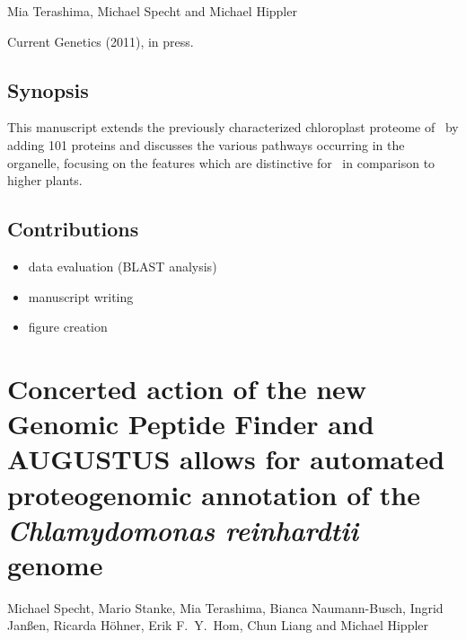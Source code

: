 Mia Terashima, Michael Specht and Michael Hippler

Current Genetics (2011), in press.

\subsection*{Synopsis}

This manuscript extends the previously characterized chloroplast proteome
of \cre~by adding 101 proteins and discusses the various pathways occurring in 
the organelle, focusing on the features which are distinctive for \cre~in
comparison to higher plants.

\subsection*{Contributions}

\begin{itemize}
\item data evaluation (BLAST analysis)
\item manuscript writing
\item figure creation
\end{itemize}

{}

\cleardoublepage
\section{Concerted action of the new Genomic Peptide Finder and AUGUSTUS allows for automated proteogenomic annotation of the {\em Chlamydomonas reinhardtii} genome}

Michael Specht, Mario Stanke, Mia Terashima, Bianca Naumann-Busch, Ingrid Janßen, Ricarda H\"ohner, Erik F.~Y.~Hom, Chun Liang and Michael Hippler

